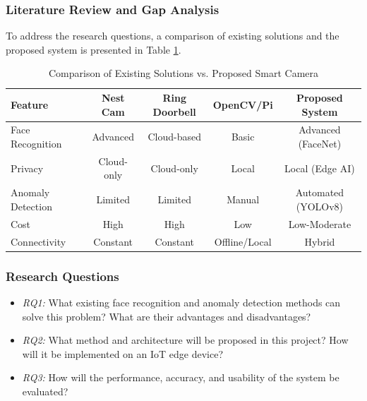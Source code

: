 \documentclass[12pt,a4paper]{article}
\begin{document}
\subsubsection{Literature Review and Gap Analysis}
To address the research questions, a comparison of existing solutions and the proposed system is presented in Table \ref{tab:comparison}.

\begin{table}[h]
    \centering
    \caption{Comparison of Existing Solutions vs. Proposed Smart Camera}
    \label{tab:comparison}
    \begin{tabular}{|l|c|c|c|c|}
        \hline
        \textbf{Feature} & \textbf{Nest Cam} & \textbf{Ring Doorbell} & \textbf{OpenCV/Pi} & \textbf{Proposed System} \\ \hline
        Face Recognition & Advanced & Cloud-based & Basic & Advanced (FaceNet) \\ \hline
        Privacy & Cloud-only & Cloud-only & Local & Local (Edge AI) \\ \hline
        Anomaly Detection & Limited & Limited & Manual & Automated (YOLOv8) \\ \hline
        Cost & High & High & Low & Low-Moderate \\ \hline
        Connectivity & Constant & Constant & Offline/Local & Hybrid \\ \hline
    \end{tabular}
\end{table}

\subsubsection{Research Questions}
\begin{itemize}
    \item \textit{RQ1:} What existing face recognition and anomaly detection methods can solve this problem? What are their advantages and disadvantages?
    \item \textit{RQ2:} What method and architecture will be proposed in this project? How will it be implemented on an IoT edge device?
    \item \textit{RQ3:} How will the performance, accuracy, and usability of the system be evaluated?
\end{itemize}
\end{document}
